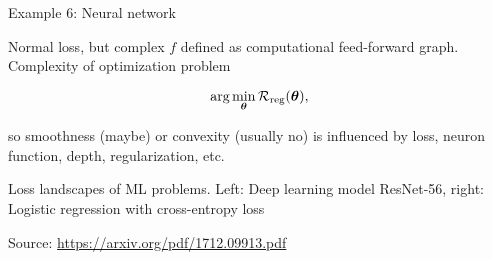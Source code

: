 \documentclass[11pt,compress,t,notes=noshow, xcolor=table]{beamer}
\begin{document}
\begin{framei}{Example 6: Neural network}
\item Normal loss, but complex $f$ defined as computational feed-forward graph. Complexity of optimization problem
\item[] $$ \text{arg} \min_{\bm{\theta}} \mathcal{R}_{\text{reg}}(\bm{\theta}), $$
\item so smoothness (maybe) or convexity (usually no) is influenced by loss, neuron function, depth, regularization, etc.
\vfill
\splitVThree
{
}
{
}
{
}
\item Loss landscapes of ML problems. Left: Deep learning model ResNet-56, right: Logistic regression with cross-entropy loss
\item Source: \url{https://arxiv.org/pdf/1712.09913.pdf}
\end{framei}


\endlecture
\end{document}
